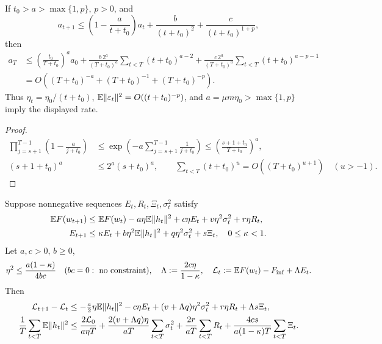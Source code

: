 \begin{lemma}\label{lem:rigid-polynomial}
If $t_0>a>\max\{1,p\}$, $p>0$, and
\begin{equation}
 a_{t+1}\le\left(1-\frac a{t+t_0}\right)a_t+
                  \frac b{(t+t_0)^2}+\frac c{(t+t_0)^{1+p}},
\end{equation}
then
\begin{align}
 a_T&\le\left(\frac{t_0}{T+t_0}\right)^a a_0
 +\frac{b\,2^a}{(T+t_0)^a}\sum_{t<T}(t+t_0)^{a-2}
 +\frac{c\,2^a}{(T+t_0)^a}\sum_{t<T}(t+t_0)^{a-p-1}\\
 &=O((T+t_0)^{-a}+(T+t_0)^{-1}+(T+t_0)^{-p}).
\end{align}
Thus $\eta_t=\eta_0/(t+t_0)$, $\mathbb E\|\varepsilon_t\|^2=O((t+t_0)^{-p})$,
and $a=\mu m\eta_0>\max\{1,p\}$ imply the displayed rate.
\end{lemma}
\begin{proof}
\begin{align}
 \prod_{j=s+1}^{T-1}\left(1-\frac a{j+t_0}\right)
 &\le\exp\left(-a\sum_{j=s+1}^{T-1}\frac1{j+t_0}\right)
 \le\left(\frac{s+1+t_0}{T+t_0}\right)^a,\\
 (s+1+t_0)^a&\le2^a(s+t_0)^a,\qquad
 \sum_{t<T}(t+t_0)^u=O((T+t_0)^{u+1})\quad(u>-1).
\end{align}
\end{proof}
\begin{theorem}\label{thm:rigid-lyapunov}
Suppose nonnegative sequences $E_t,R_t,\Xi_t,\sigma_t^2$ satisfy
\begin{align}
 \mathbb E F(w_{t+1})&\le\mathbb E F(w_t)-a\eta\mathbb E\|h_t\|^2
               +c\eta E_t+v\eta^2\sigma_t^2+r\eta R_t,\\
 E_{t+1}&\le\kappa E_t+b\eta^2\mathbb E\|h_t\|^2+q\eta^2\sigma_t^2+s\Xi_t,
 \quad0\le\kappa<1.
\end{align}
Let $a,c>0$, $b\ge0$,
\begin{gather}
 \eta^2\le\frac{a(1-\kappa)}{4bc}\quad(bc=0:\ \text{no constraint}),\quad
 \Lambda:=\frac{2c\eta}{1-\kappa},\quad
 \mathcal L_t:=\mathbb E F(w_t)-F_{\inf}+\Lambda E_t.
\end{gather}
Then
\begin{align}
 \mathcal L_{t+1}-\mathcal L_t
 &\le-\tfrac a2\eta\mathbb E\|h_t\|^2-c\eta E_t
       +(v+\Lambda q)\eta^2\sigma_t^2+r\eta R_t+\Lambda s\Xi_t,\\
 \frac1T\sum_{t<T}\mathbb E\|h_t\|^2
 &\le\frac{2\mathcal L_0}{a\eta T}
 +\frac{2(v+\Lambda q)\eta}{aT}\sum_{t<T}\sigma_t^2
 +\frac{2r}{aT}\sum_{t<T}R_t
 +\frac{4cs}{a(1-\kappa)T}\sum_{t<T}\Xi_t.
\end{align}
\end{theorem}
